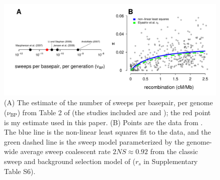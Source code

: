 \documentclass[11pt]{article}
\begin{document}
\begin{figure}[!htb]
  \centering
  \includegraphics[width=\textwidth]{figures/linked_sel_params.pdf}

  \caption{(A) The estimate of the number of sweeps per basepair, per genome
    ($\nu_\text{BP}$) from Table 2 of \textcite{Elyashiv2016-vt} (the studies
    included are \cite{Li2006-xa,Andolfatto2007-uy,Macpherson2007-qt} and
    \cite{Jensen2008-vz}); the red point is my estimate used in
    this paper. (B) Points are the data from \textcite{Shapiro2007-gp}.  The
    blue line is the non-linear least squares fit to the data, and the green
    dashed line is the sweep model parameterized by the genome-wide average
    sweep coalescent rate $2NS \approx 0.92$ from the classic sweep and
  background selection model of \textcite{Elyashiv2016-vt} ($r_s$ in
Supplementary Table S6).}

  \label{suppfig:linked-sel-params}
\end{figure}
\end{document}
